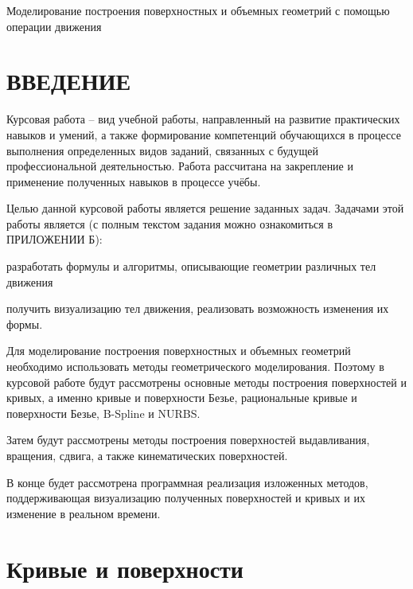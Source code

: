 \documentclass{bmstu}
\newenvironment{gost-itemize}
{\begin{itemize}[label=---,itemindent=\parindent,leftmargin=0pt]}
	{\end{itemize}}
\begin{document}
\makecourseworktitle
{} %
{} %
{Моделирование построения поверхностных и объемных геометрий с помощью операции движения} %
{} %
{} %
{} %

\maketableofcontents

\chapter*{ВВЕДЕНИЕ}
Курсовая работа – вид учебной работы, направленный на развитие практических навыков и умений, а также формирование компетенций обучающихся в процессе выполнения определенных видов заданий, связанных с будущей профессиональной деятельностью. Работа рассчитана на закрепление и применение полученных навыков в процессе учёбы.

Целью данной курсовой работы является решение заданных задач. Задачами этой работы является (с полным текстом задания можно ознакомиться в ПРИЛОЖЕНИИ Б):
\begin{gost-itemize}
\item разработать формулы и алгоритмы, описывающие геометрии различных тел движения
\item получить визуализацию тел движения, реализовать возможность изменения их формы.
\end{gost-itemize}

Для моделирование построения поверхностных и объемных геометрий необходимо использовать методы геометрического моделирования.
Поэтому в курсовой работе будут рассмотрены основные методы построения поверхностей и кривых, а именно  кривые и поверхности Безье, рациональные кривые и поверхности Безье, B-Spline и NURBS.

Затем будут рассмотрены методы построения поверхностей выдавливания, вращения, сдвига, а также кинематических поверхностей.

В конце будет рассмотрена программная реализация изложенных методов, поддерживающая визуализацию полученных поверхностей и кривых и их изменение в реальном времени.



\chapter{Кривые и поверхности}
\end{document}
